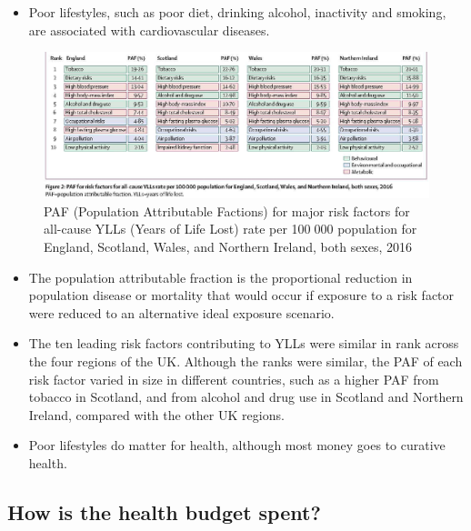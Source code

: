 \begin{itemize}           
        \item Poor lifestyles, such as poor diet, drinking alcohol, inactivity and smoking, are associated with cardiovascular diseases.
        \end{itemize}

\begin{figure}[H]%
                \centering
                \includegraphics[width=5in]{images/ch3/17.png}
                \caption{PAF (Population Attributable Factions) for major risk factors for all-cause YLLs (Years of Life Lost) rate per 100 000 population for England, Scotland, Wales, and Northern Ireland, both sexes, 2016}
                \label{fig:label}
            \end{figure} 

\begin{itemize}           
        \item The population attributable fraction is the proportional reduction in population disease or mortality that would occur if exposure to a risk factor were reduced to an alternative ideal exposure scenario. 
        \item The ten leading risk factors contributing to YLLs were similar in rank across the four regions of the UK. Although the ranks were similar, the PAF of each risk factor varied in size in different countries, such as a higher PAF from tobacco in Scotland, and from alcohol and drug use in Scotland and Northern Ireland, compared with the other UK regions.
        \item Poor lifestyles do matter for health, although most money goes to curative health.
        \end{itemize}

        \subsection{How is the health budget spent?} 
